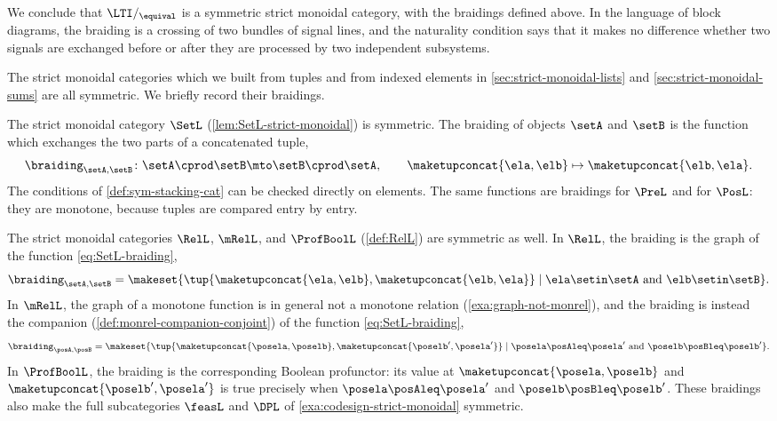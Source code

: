 \begin{example}
    We conclude that $\LTI/_{\equival}$ is a symmetric strict monoidal category, with the braidings defined above.
    In the language of block diagrams, the braiding is a crossing of two bundles of signal lines, and the naturality condition says that it makes no difference whether two signals are exchanged before or after they are processed by two independent subsystems.
\end{example}

The strict monoidal categories which we built from tuples and from indexed elements in \cref{sec:strict-monoidal-lists} and \cref{sec:strict-monoidal-sums} are all symmetric.
We briefly record their braidings.

\begin{example}[Tuples]
    \label{exa:SetL-symmetric}
    The strict monoidal category $\SetL$ (\cref{lem:SetL-strict-monoidal}) is symmetric.
    The braiding of objects $\setA$ and $\setB$ is the function which exchanges the two parts of a concatenated tuple,
    \begin{equation}
        \label{eq:SetL-braiding}
        \braiding_{\setA,\setB} \colon \setA \cprod \setB \mto \setB \cprod \setA,
        \qquad
        \maketupconcat{\ela, \elb} \mapsto \maketupconcat{\elb, \ela}.
    \end{equation}
    The conditions of \cref{def:sym-stacking-cat} can be checked directly on elements.
    The same functions are braidings for $\PreL$ and for $\PosL$: they are monotone, because tuples are compared entry by entry.
\end{example}

\begin{example}
    \label{exa:RelL-symmetric}
    The strict monoidal categories $\RelL$, $\mRelL$, and $\ProfBoolL$ (\cref{def:RelL}) are symmetric as well.
    In $\RelL$, the braiding is the graph of the function \cref{eq:SetL-braiding},
    \begin{equation}
        \label{eq:RelL-braiding}
        \braiding_{\setA,\setB} = \makeset{ \tup{\maketupconcat{\ela, \elb}, \maketupconcat{\elb, \ela}} \mid \ela \setin \setA \text{ and } \elb \setin \setB }.
    \end{equation}
    In $\mRelL$, the graph of a monotone function is in general not a monotone relation (\cref{exa:graph-not-monrel}), and the braiding is instead the companion (\cref{def:monrel-companion-conjoint}) of the function \cref{eq:SetL-braiding},
    \begin{equation}
        \label{eq:mRelL-braiding}
        \braiding_{\posA,\posB} = \makeset{ \tup{\maketupconcat{\posela, \poselb}, \maketupconcat{\poselb', \posela'}} \mid \posela \posAleq \posela' \text{ and } \poselb \posBleq \poselb' }.
    \end{equation}
    In $\ProfBoolL$, the braiding is the corresponding Boolean profunctor: its value at $\maketupconcat{\posela, \poselb}$ and $\maketupconcat{\poselb', \posela'}$ is true precisely when $\posela \posAleq \posela'$ and $\poselb \posBleq \poselb'$.
    These braidings also make the full subcategories $\feasL$ and $\DPL$ of \cref{exa:codesign-strict-monoidal} symmetric.
\end{example}

